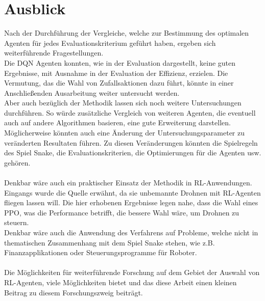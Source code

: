 \section{Ausblick}
Nach der Durchführung der Vergleiche, welche zur Bestimmung des optimalen Agenten für jedes Evaluationskriterium geführt haben, ergeben sich weiterführende Fragestellungen.\\
Die DQN Agenten konnten, wie in der Evaluation dargestellt, keine guten Ergebnisse, mit Ausnahme in der Evaluation der Effizienz, erzielen. Die Vermutung, das die Wahl von Zufallsaktionen dazu führt, könnte in einer Anschließenden Ausarbeitung weiter untersucht werden.\\
Aber auch bezüglich der Methodik lassen sich noch weitere Untersuchungen durchführen. 
So würde zusätzliche Vergleich von weiteren Agenten, die eventuell auch auf andere Algorithmen basieren, eine gute Erweiterung darstellen.\\
Möglicherweise könnten auch eine Änderung der Untersuchungsparameter zu veränderten Resultaten führen. Zu diesen Veränderungen könnten die Spielregeln des Spiel Snake, die Evaluationskriterien, die Optimierungen für die Agenten usw. gehören.\\
\\Denkbar wäre auch ein praktischer Einsatz der Methodik in RL-Anwendungen. Eingangs wurde die Quelle \cite{UAV} erwähnt, da sie unbemannte Drohnen mit RL-Agenten fliegen lassen will. Die hier erhobenen Ergebnisse legen nahe, dass die Wahl eines PPO, was die Performance betrifft, die bessere Wahl wäre, um Drohnen zu steuern.\\
Denkbar wäre auch die Anwendung des Verfahrens auf Probleme, welche nicht in thematischen Zusammenhang mit dem Spiel Snake stehen, wie z.B. Finanzapplikationen oder Steuerungsprogramme für Roboter.\\
\\Die Möglichkeiten für weiterführende Forschung auf dem Gebiet der Auswahl von RL-Agenten, viele Möglichkeiten bietet und das diese Arbeit einen kleinen Beitrag zu diesem Forschungszweig beiträgt.